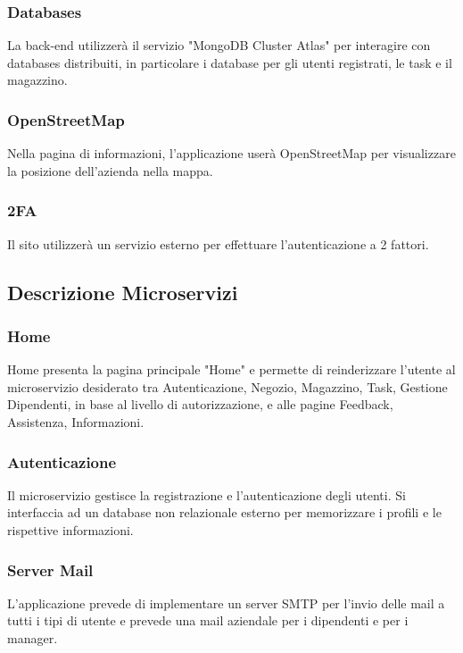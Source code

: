 \documentclass{report}
\begin{document}
\subsubsection{Databases}
La back-end utilizzerà il servizio "MongoDB Cluster Atlas" per interagire con databases distribuiti, in particolare i database per gli utenti registrati, le task e il magazzino.

\subsubsection{OpenStreetMap}
Nella pagina di informazioni, l'applicazione userà OpenStreetMap per visualizzare la posizione dell'azienda nella mappa.

\subsubsection{2FA}
Il sito utilizzerà un servizio esterno per effettuare l'autenticazione a 2 fattori.

\subsection{Descrizione Microservizi}

\subsubsection*{Home}
Home presenta la pagina principale "Home" e permette di reinderizzare l'utente al microservizio desiderato tra Autenticazione, Negozio, Magazzino, Task, Gestione Dipendenti, in base al livello di autorizzazione, e alle pagine Feedback, Assistenza, Informazioni.

\subsubsection*{Autenticazione}
Il microservizio gestisce la registrazione e l'autenticazione degli utenti. Si interfaccia ad un database non relazionale esterno per memorizzare i profili e le rispettive informazioni.

\subsubsection*{Server Mail}
L'applicazione prevede di implementare un server SMTP per l’invio delle mail a tutti i tipi di utente e prevede una mail aziendale per i dipendenti e per i manager.
\end{document}
